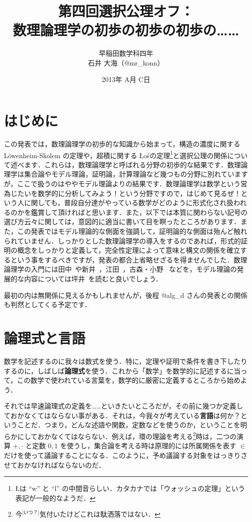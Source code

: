 \documentclass[a4j]{jsarticle}
\title{第四回選択公理オフ：\\数理論理学の初歩の初歩の初歩の……}
\author{早稲田数学科四年\\石井 大海（@mr\_konn）}
\date{2013年 A月 C日}
\newcommand{\Los}{{\L}o\'{s}}
\begin{document}
\maketitle

\section{はじめに}
この発表では，数理論理学の初歩的な知識から始まって，構造の濃度に関する L\"{o}wenheim-Skolem の定理や，超積に関する \Los の定理\footnote{\L は ``w'' と ``l'' の中間音らしい．カタカナでは「ウォッシュの定理」という表記が一般的なようだ．}と選択公理の関係について述べます．これらは，数理論理学と呼ばれる分野の初歩的な結果です．数理論理学は集合論やモデル理論，証明論，計算理論など幾つもの分野に別れていますが，ここで扱うのはややモデル理論よりの結果です．数理論理学は数学という営為じたいを数学的に分析してみよう！という分野ですので，はじめて見るぜ！という人に関しても，普段自分達がやっている数学がどのように形式化され扱われるのかを鑑賞して頂ければと思います．また，以下では本質に関わらない記号の選び方云々に関しては，意図的に適当に書いて目を瞑ったところがあります．また，この発表ではモデル理論的な側面を強調して，証明論的な側面は殆んど触れられていません．しっかりとした数理論理学の導入をするのであれば，形式的証明の概念をしっかりと定義して，完全性定理によって意味と構文の関係を確立するという事をするべきですが，発表の都合上省略せざるを得ませんでした．数理論理学の入門には田中~\cite{Tanaka}や新井~\cite{Arai}，江田~\cite{Eda}，古森・小野~\cite{Komori} などを，モデル理論の発展的な内容については坪井~\cite{Tsuboi}を読むと良いでしょう．

最初の内は無関係に見えるかもしれませんが，後程 @alg\_d さんの発表との関係も判然としてくる予定です．

\section{論理式と言語}
数学を記述するのに我々は数式を使う．特に，定理や証明で条件を書き下したりするのに，しばしば{\bfseries 論理式}を使う．これから「数学」を数学的に記述するに当って，この数学で使われている言葉を，数学的に厳密に定義するところから始めよう．

それでは早速論理式の定義を……といきたいところだが，その前に幾つか定義しておかなくてはならない事がある．それは，今我々が考えている{\bfseries 言語}は何か？ということだ．つまり，どんな述語や関数，定数などを使うのか，ということを明らかにしておかなくてはならない．例えば，環の理論を考える\footnote{今$^{\text{[いつ？]}}$気付いたけどこれは駄洒落ではない．}時は，二つの演算 $+, \cdot$ と定数 $0, 1$ を使うし，集合論を考える時は原理的には所属関係を表す $\in$ だけを使って議論することになる．このように，予め議論する対象をはっきりさせておかなければならないのだ．
\end{document}
